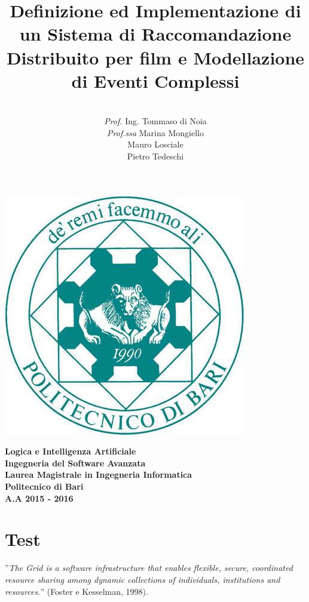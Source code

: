 \documentclass[11pt]{article}
\date{}
\begin{document}
\title{\textbf{Definizione ed Implementazione di un Sistema di Raccomandazione Distribuito per film
		e Modellazione di Eventi Complessi}}

\author{\\\textit{Prof.} Ing. Tommaso di Noia\\\textit{Prof.ssa} Marina Mongiello \\
	Mauro Losciale\\ 
	Pietro Tedeschi\\}

\clearpage\maketitle
\thispagestyle{empty}

\begin{center}
	\includegraphics[scale=0.40]{images/poliba.jpg}
\end{center}

{\textbf{\center Logica e Intelligenza Artificiale\\Ingegneria del Software Avanzata\\ Laurea Magistrale in Ingegneria Informatica\\Politecnico di Bari\\A.A 2015 - 2016\\}}

\newpage
\clearpage
\thispagestyle{empty}
\renewcommand\contentsname{Indice}
\tableofcontents
\newpage
\setcounter{page}{1}
\section{Test}
''\emph{The Grid is a software infrastructure that enables flexible, secure, coordinated resource sharing among dynamic collections of individuals, institutions and resources.}'' (Foster e Kesselman, 1998).
\end{document}
